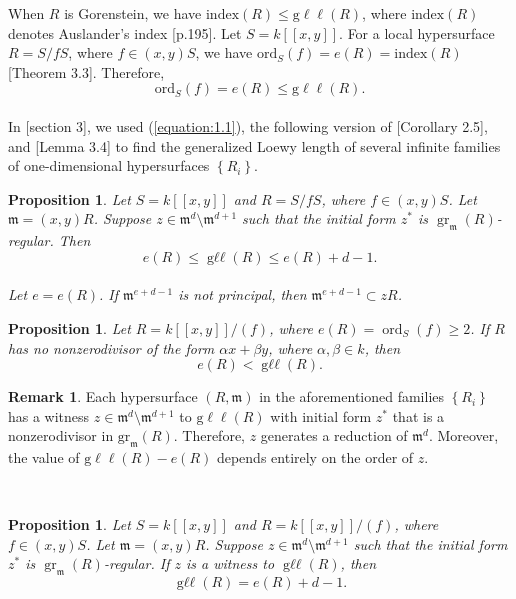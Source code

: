 \documentclass{amsart}
\newtheorem{proposition}[theorem]{Proposition}
\theoremstyle{definition}
\theoremstyle{definition}
\newtheorem{remark}[theorem]{Remark}
\numberwithin{equation}{section}
\theoremstyle{definition}
\DeclareMathOperator{\Gll}{g\ell\ell}
\DeclareMathOperator{\Gr}{gr}
\DeclareMathOperator{\Ord}{ord}
\begin{document}
{When $R$ is Gorenstein, we have $\text{index}(R) \leq \text{g}\ell\ell(R)$, where $\text{index}(R)$ denotes Auslander's index \cite{LW12}[p.195]. Let $S=k[[x,y]]$. For a local hypersurface $R=S/fS$, where $f \in (x,y)S$, we have $\text{ord}_{S}(f)=e(R)=\text{index}(R)$ \cite{Ding92}[Theorem 3.3]. Therefore, \\
\begin{equation}\label{equation:1.1}
\text{ord}_{S}(f)=e(R) \leq \text{g}\ell\ell(R).
\end{equation}\text{}\\
 In \cite{Bartels24}[section 3], we used (\ref{equation:1.1}), the following version of \cite{Bartels24}[Corollary 2.5], and \cite{Bartels24}[Lemma 3.4] to find the generalized Loewy length of several infinite families of one-dimensional hypersurfaces $\left\{R_i \right\}$.\text{}\\
\begin{proposition}\cite[Corollary 2.5]{Bartels24}\label{prop:1.1}
Let $S=k[[x,y]]$ and $R=S/fS$, where $f \in (x,y)S$. Let $\mathfrak{m}=(x,y)R$. Suppose $z \in \mathfrak{m}^d \setminus \mathfrak{m}^{d+1}$ such that the initial form $z^*$ is $\Gr_{\mathfrak{m}}(R)$-regular. Then 
\begin{equation*}
e(R) \leq \Gll (R) \leq e(R)+d-1.
\end{equation*} \text{}\\
Let $e=e(R)$. If $\mathfrak{m}^{e+d-1}$ is not principal, then $\mathfrak{m}^{e+d-1} \subset zR$.
\end{proposition} \text{}
\begin{proposition}\cite[Lemma 3.4]{Bartels24}\label{prop:1.2} Let $R=k[[x,y]]/(f)$, where $e(R)=\Ord_{S}(f) \geq 2$. If $R$ has no nonzerodivisor of the form $\alpha x + \beta y$, where $\alpha, \beta \in k$, then \\
\[
e(R) < \Gll(R).
\]
\end{proposition}\text{}
\begin{remark}
Each hypersurface $(R, \mathfrak{m})$ in the aforementioned families $\left\{ R_{i} \right\}$ has a witness $z \in \mathfrak{m}^d \setminus \mathfrak{m}^{d+1}$ to $\text{g}\ell\ell(R)$ with initial form $z^*$ that is a nonzerodivisor in $\text{gr}_{\mathfrak{m}}(R)$. Therefore, $z$ generates a reduction of $\mathfrak{m}^d$. Moreover, the value of $\text{g}\ell\ell(R)-e(R)$ depends entirely on the order of $z$.\end{remark}
\text{}\\
\begin{proposition}\cite[Proposition 3.3]{Bartels24}\label{prop:1.3}
Let $S=k[[x,y]]$ and $R=k[[x,y]]/(f)$, where $f \in (x,y)S$. Let $\mathfrak{m}=(x,y)R$. Suppose $z \in \mathfrak{m}^{d} \setminus \mathfrak{m}^{d+1}$ such that the initial form $z^*$ is $\Gr_{\mathfrak{m}}(R)$-regular. If $z$ is a witness to $\Gll(R)$, then
\[
\Gll (R) = e(R) +d -1.
\]
\end{proposition}
\text{}

}
\end{document}
